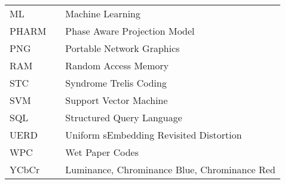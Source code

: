 {\begin{tabular}{l l l}
    ML          && Machine Learning\\
    PHARM       && Phase Aware Projection Model\\
    PNG         && Portable Network Graphics\\
    RAM         && Random Access Memory\\
    STC        && Syndrome Trelis Coding\\
    SVM       && Support Vector Machine\\
    SQL        & & Structured Query Language\\
    UERD       & & Uniform sEmbedding Revisited Distortion\\ 
    WPC        && Wet Paper Codes\\
    YCbCr      &&Luminance, Chrominance Blue, Chrominance Red\\

\end{tabular} }

